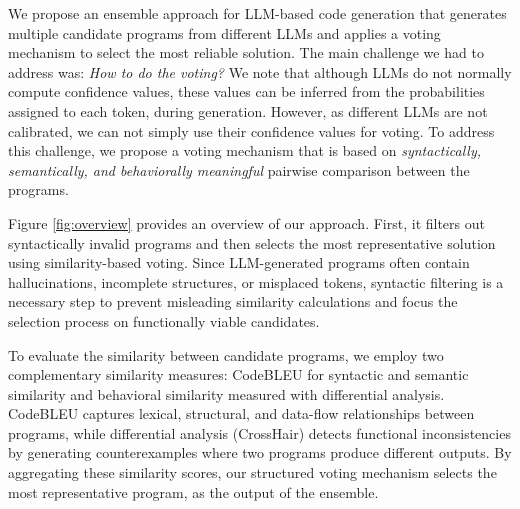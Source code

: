 \documentclass{article}
\begin{document}
We propose an ensemble approach for LLM-based code generation that generates multiple candidate programs from different LLMs and applies a voting mechanism to select the most reliable solution.  The main challenge we had to address was: {\em How to do the voting?} We note that although LLMs do not normally compute confidence values, these values can be inferred from the probabilities assigned to each token, during generation. However, as different LLMs are not calibrated, we can not simply use their confidence values for voting. To address this challenge, we propose a voting mechanism that is based on {\em syntactically, semantically, and behaviorally meaningful} pairwise comparison between the programs.



Figure \ref{fig:overview} provides an overview of our approach.
First, it filters out syntactically invalid programs and then selects the most representative solution using similarity-based voting. Since LLM-generated programs often contain hallucinations, incomplete structures, or misplaced tokens, syntactic filtering is a necessary step to prevent misleading similarity calculations and focus the selection process on functionally viable candidates.

To evaluate the similarity between candidate programs, we employ two complementary similarity measures: CodeBLEU for syntactic and semantic similarity and  behavioral similarity measured with differential analysis. CodeBLEU captures lexical, structural, and data-flow relationships between programs, while differential analysis (CrossHair) detects functional inconsistencies by generating counterexamples where two programs produce different outputs. By aggregating these similarity scores, our structured voting mechanism selects the most representative program, as the output of the ensemble.
\end{document}
